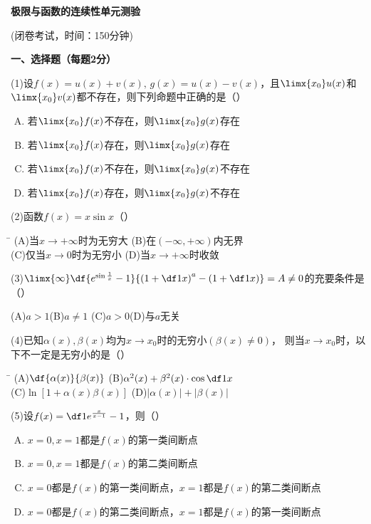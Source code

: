 
\begin{center}
	{\Large\bf 极限与函数的连续性单元测验}
	
	(闭卷考试，时间：150分钟)
\end{center}

{\bf 一、选择题（每题2分）}

(1)\;设$f(x)=u(x)+v(x),\,g(x)=u(x)-v(x)$，且$\limx{x_0}u(x)$和
$\limx{x_0}v(x)$都不存在，则下列命题中正确的是（\quad）%
\begin{enumerate}[(A)]
  \setlength{\itemindent}{1cm}
  \item 若$\limx{x_0}f(x)$不存在，则$\limx{x_0}g(x)$存在
  \item 若$\limx{x_0}f(x)$存在，则$\limx{x_0}g(x)$存在
  \item 若$\limx{x_0}f(x)$不存在，则$\limx{x_0}g(x)$不存在
  \item 若$\limx{x_0}f(x)$存在，则$\limx{x_0}g(x)$不存在
\end{enumerate}

(2)\;函数$f(x)=x\sin x$（\quad）%
\begin{tabbing}
	\hspace{8cm}\=\kill
	\quad\quad\quad(A)\;当$x\to+\infty$时为无穷大 \> 
	(B)\;在$(-\infty,+\infty)$内无界 \\ 
	\quad\quad\quad(C)\;仅当$x\to0$时为无穷小\>
	(D)\;当$x\to+\infty$时收敛
\end{tabbing}

(3)\;$\limx{\infty}\df{e^{\sin\frac1x}-1}{\left(1+\df1x\right)^a
-\left(1+\df1x\right)}=A\ne 0$的充要条件是（\quad）%

\quad (A)\;$a>1$\quad\quad\quad(B)\;$a\ne 1$
\quad\quad\quad (C)\;$a>0$\quad\quad\quad(D)\;与$a$无关

(4)\;已知$\alpha(x),\beta(x)$均为$x\to x_0$时的无穷小$(\beta(x)\ne0)$，
则当$x\to x_0$时，以下不一定是无穷小的是（\quad）%

\begin{tabbing}
	\hspace{8cm}\=\kill
	\quad\quad\quad(A)\;$\df{\alpha(x)}{\beta(x)}$ \> 
	(B)\;$\alpha^2(x)+\beta^2(x)\cdot\cos\df1x$ \\ 
	\quad\quad\quad(C)\;$\ln[1+\alpha(x)\beta(x)]$\>
	(D)\;$|\alpha(x)|+|\beta(x)|$ 
\end{tabbing}

(5)\;设$f(x)=\df1{e^{\frac{x}{x-1}}-1}$，则（\quad）%
\begin{enumerate}[(A)]
  \setlength{\itemindent}{1cm}
  \item $x=0,x=1$都是$f(x)$的第一类间断点
  \item $x=0,x=1$都是$f(x)$的第二类间断点
  \item $x=0$都是$f(x)$的第一类间断点，$x=1$都是$f(x)$的第二类间断点
  \item $x=0$都是$f(x)$的第二类间断点，$x=1$都是$f(x)$的第一类间断点
\end{enumerate}

